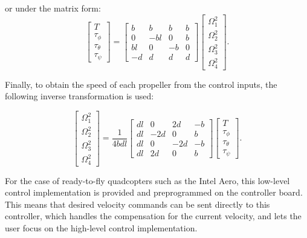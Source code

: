 or under the matrix form:
\begin{equation}
  \begin{bmatrix}
    T \\
    \tau_{\phi} \\
    \tau_{\theta} \\
    \tau_{\psi}
  \end{bmatrix} = \begin{bmatrix}
    b & b & b & b\\
    0 & -bl & 0 & b\\
    bl & 0 & -b & 0\\
    -d & d & d & d
  \end{bmatrix}
  \begin{bmatrix}
    \Omega_1^2\\
    \Omega_2^2\\
    \Omega_3^2\\
    \Omega_4^2
  \end{bmatrix}.
  \label{eq:motor_speed}
\end{equation}

Finally, to obtain the speed of each propeller from the control inputs, the
following inverse transformation is used:

\begin{equation}
  \begin{bmatrix}
    \Omega_1^2 \\ \Omega_2^2 \\ \Omega_3^2 \\ \Omega_4^2
  \end{bmatrix} = \frac{1}{4 b d l} \begin{bmatrix}
    dl & 0 & 2d & -b\\
    dl & -2d & 0 & b\\
    dl & 0 & -2d & -b\\
    dl & 2d & 0 & b 
  \end{bmatrix}
  \begin{bmatrix}
    T\\
    \tau_{\phi}\\
    \tau_{\theta}\\
    \tau_{\psi}
  \end{bmatrix}.
  \label{eq:motor_speed}
\end{equation}

For the case of ready-to-fly quadcopters such as the Intel Aero, this low-level
control implementation is provided and preprogrammed on the controller board.
This means that desired velocity commands can be sent directly to this
controller, which handles the compensation for the current velocity, and lets
the user focus on the high-level control implementation.
